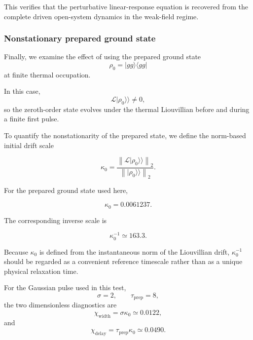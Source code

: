 \documentclass[11pt]{article}
\begin{document}
This verifies that the perturbative linear-response equation is
recovered from the complete driven open-system dynamics in the
weak-field regime.


\subsubsection{Nonstationary prepared ground state}

Finally, we examine the effect of using the prepared ground state
%
\begin{equation}
\rho_0
=
|gg\rangle\langle gg|
\end{equation}
%
at finite thermal occupation.

In this case,
%
\begin{equation}
\mathcal{L}
|\rho_0\rangle\rangle
\neq0,
\end{equation}
%
so the zeroth-order state evolves under the thermal Liouvillian before
and during a finite first pulse.

To quantify the nonstationarity of the prepared state, we define the
norm-based initial drift scale

\begin{equation}
\boxed{
\kappa_0
=
\frac{
\left\|
\mathcal{L}
|\rho_0\rangle\rangle
\right\|_2
}{
\left\|
|\rho_0\rangle\rangle
\right\|_2
}.
}
\label{eq:initial_drift_scale}
\end{equation}

For the prepared ground state used here,

\begin{equation}
\boxed{
\kappa_0
=
0.0061237.
}
\end{equation}

The corresponding inverse scale is

\begin{equation}
\kappa_0^{-1}
\simeq
163.3.
\end{equation}

Because $\kappa_0$ is defined from the instantaneous norm of the
Liouvillian drift, $\kappa_0^{-1}$ should be regarded as a convenient
reference timescale rather than as a unique physical relaxation time.

For the Gaussian pulse used in this test,
%
\begin{equation}
\sigma
=
2,
\qquad
\tau_{\mathrm{prep}}
=
8,
\end{equation}
%
the two dimensionless diagnostics are
%
\begin{equation}
\boxed{
\chi_{\mathrm{width}}
=
\sigma\kappa_0
\simeq
0.0122,
}
\end{equation}
%
and
%
\begin{equation}
\boxed{
\chi_{\mathrm{delay}}
=
\tau_{\mathrm{prep}}\kappa_0
\simeq
0.0490.
}
\end{equation}
\end{document}
